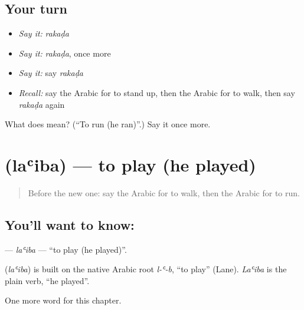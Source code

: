\subsection*{Your turn}
\begin{itemize}
\raggedright
  \item \emph{Say it:} \emph{rakaḍa}
  \item \emph{Say it:} \emph{rakaḍa}, once more
  \item \emph{Say it:} say \emph{rakaḍa}
  \item \emph{Recall:} say the Arabic for to stand up, then the Arabic for to walk, then say \emph{rakaḍa} again
\end{itemize}

\begin{tcolorbox}[breakable,colback=teal!4,colframe=teal!35!black,title={Before you move on}]
What does  mean? (\textquotedblleft{}To run (he ran)\textquotedblright{}.) Say it once more.
\end{tcolorbox}
\section[\texorpdfstring{\ar{لعب} (laʿiba)}{لعب (laʿiba)}]{ (laʿiba) — to play (he played)}

\label{lesson:AR-C58-laiba}



\begin{quote}
Before the new one: say the Arabic for to walk, then the Arabic for to run.
\end{quote}

\subsection*{You'll want to know: }
\textbf{} — \emph{laʿiba} — \textquotedblleft{}to play (he played)\textquotedblright{}.

\begin{cousinweb}
\textbf{} (\emph{laʿiba}) is built on the native Arabic root \emph{l-ʿ-b}, \textquotedblleft{}to play\textquotedblright{} (Lane). \emph{Laʿiba} is the plain verb, \textquotedblleft{}he played\textquotedblright{}.
\end{cousinweb}

\begin{grammarlens}[title={What you've built}]
One more word for this chapter.
\end{grammarlens}

